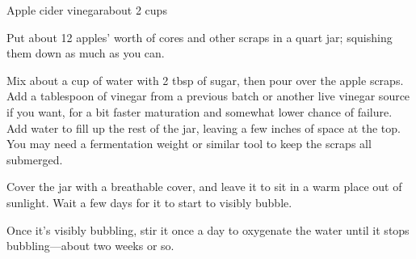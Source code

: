 \documentclass{article}
\begin{document}
  \begin{recipe}{Apple cider vinegar}{about 2 cups}
    \begin{step}
      \begin{ingrs}
      \end{ingrs}
      \begin{stepdesc}
        Put about 12 apples' worth of cores and other scraps in a quart jar; squishing them down as much as you can.
      \end{stepdesc}
    \end{step}
    \begin{step}
      \begin{ingrs}
      \end{ingrs}
      \begin{stepdesc}
        Mix about a cup of water with 2 tbsp of sugar, then pour over the apple scraps. Add a tablespoon of vinegar from a previous batch or another live vinegar source if you want, for a bit faster maturation and somewhat lower chance of failure. Add water to fill up the rest of the jar, leaving a few inches of space at the top. You may need a fermentation weight or similar tool to keep the scraps all submerged.
      \end{stepdesc}
    \end{step}
    \begin{step}
      \begin{ingrs}
      \end{ingrs}
      \begin{stepdesc}
        Cover the jar with a breathable cover, and leave it to sit in a warm place out of sunlight. Wait a few days for it to start to visibly bubble.
      \end{stepdesc}
    \end{step}
    \begin{step}
      \begin{ingrs}
      \end{ingrs}
      \begin{stepdesc}
        Once it's visibly bubbling, stir it once a day to oxygenate the water until it stops bubbling---about two weeks or so.
      \end{stepdesc}
    \end{step}

\end{recipe}
\end{document}
